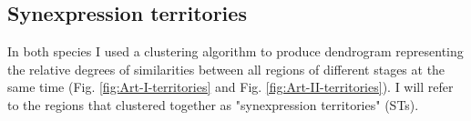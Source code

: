 \subsection{Synexpression territories}
%

In both species I used a clustering algorithm to produce dendrogram representing the relative degrees of similarities between all regions of different stages at the same time (Fig. \ref{fig:Art-I-territories} and Fig. \ref{fig:Art-II-territories}).
I will refer to the regions that clustered together as "synexpression territories" (STs).

